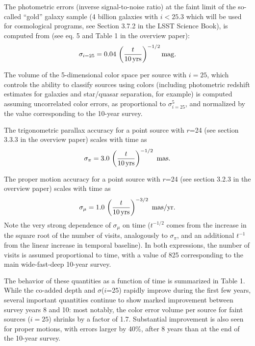 \documentclass[DM,lsstdraft,toc,usenatbib]{lsstdoc}
\begin{document}
The photometric errors (inverse signal-to-noise ratio) at the faint limit of the so-called 
``gold'' galaxy sample (4 billion galaxies with $i<25.3$ which will be used for cosmological
programs, see Section 3.7.2 in the LSST Science Book), is computed from (see eq. 5 and Table 1 
in the overview paper):
\begin{equation} 
                \sigma_{i=25} = 0.04 \, \left({t \over 10 \, {\rm yrs}}\right)^{-1/2} {\rm mag.}
\end{equation}

The volume of the 5-dimensional color space per source with $i=25$,  which controls the ability 
to classify sources using colors (including photometric redshift estimates for galaxies and star/quasar
separation, for example) is computed assuming uncorrelated color errors, as proportional
to $\sigma^5_{i=25}$, and normalized by the value corresponding to the 10-year survey. 

The trigonometric parallax accuracy for a point source with $r$=24 (see section 3.3.3 in the 
overview paper) scales with time as 
\begin{equation}
        \sigma_\pi = 3.0 \,  \left({t \over 10 \, {\rm yrs}}\right)^{-1/2}  \,\,  {\rm mas.} 
\end{equation}

The proper motion accuracy for a point source with $r$=24 (see section 3.2.3 in the overview paper)
scales with time as 
\begin{equation}
        \sigma_\mu = 1.0 \,  \left({t \over 10 \, {\rm yrs}}\right)^{-3/2}   \,\, {\rm mas/yr.} 
\end{equation}
Note the very strong dependence of  $\sigma_\mu$ on time ($t^{-1/2}$ comes from the
increase in the square root of the number of visits, analogously to $\sigma_\pi$, and 
an additional $t^{-1}$ from the linear increase in temporal baseline).  In both expressions,
the number of visits is assumed proportional to time, with a value of 825 corresponding to the 
main wide-fast-deep 10-year survey. 

The behavior of these quantities as a function of time is summarized in Table 1. While 
the co-added depth and $\sigma$($i$=25) rapidly improve during the first few years, 
several important quantities continue to show marked improvement between survey 
years 8 and 10: most notably, the color error volume per source for faint sources ($i=25$) 
shrinks by a factor of 1.7.  Substantial improvement is also seen for proper motions, 
with errors larger by 40\%, after 8 years than at the end of the 10-year survey.  
\end{document}
